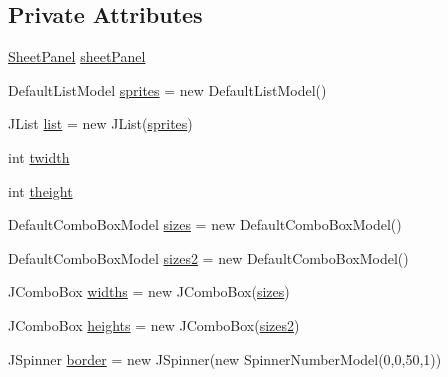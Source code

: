 \subsection*{Private Attributes}
\begin{DoxyCompactItemize}
\item 
\mbox{\hyperlink{classorg_1_1newdawn_1_1slick_1_1tools_1_1packulike_1_1_sheet_panel}{Sheet\+Panel}} \mbox{\hyperlink{classorg_1_1newdawn_1_1slick_1_1tools_1_1packulike_1_1_packer_af39b29a5c9105d3079b3e2df19008ad8}{sheet\+Panel}}
\item 
Default\+List\+Model \mbox{\hyperlink{classorg_1_1newdawn_1_1slick_1_1tools_1_1packulike_1_1_packer_a5684e96219ce89e574c4550d3c650eaa}{sprites}} = new Default\+List\+Model()
\item 
J\+List \mbox{\hyperlink{classorg_1_1newdawn_1_1slick_1_1tools_1_1packulike_1_1_packer_a45e8438e951eb84f2efaf06e5ae481bd}{list}} = new J\+List(\mbox{\hyperlink{classorg_1_1newdawn_1_1slick_1_1tools_1_1packulike_1_1_packer_a5684e96219ce89e574c4550d3c650eaa}{sprites}})
\item 
int \mbox{\hyperlink{classorg_1_1newdawn_1_1slick_1_1tools_1_1packulike_1_1_packer_ad8d50a999815f740d8690c45e408db6c}{twidth}}
\item 
int \mbox{\hyperlink{classorg_1_1newdawn_1_1slick_1_1tools_1_1packulike_1_1_packer_ae627e80430f7f495a1c7542ea9040668}{theight}}
\item 
Default\+Combo\+Box\+Model \mbox{\hyperlink{classorg_1_1newdawn_1_1slick_1_1tools_1_1packulike_1_1_packer_a29634c52b37f367f3e1c6f534b690f2d}{sizes}} = new Default\+Combo\+Box\+Model()
\item 
Default\+Combo\+Box\+Model \mbox{\hyperlink{classorg_1_1newdawn_1_1slick_1_1tools_1_1packulike_1_1_packer_a88ad350f9bcdf274650f612a9fec4fd4}{sizes2}} = new Default\+Combo\+Box\+Model()
\item 
J\+Combo\+Box \mbox{\hyperlink{classorg_1_1newdawn_1_1slick_1_1tools_1_1packulike_1_1_packer_a3a9b0950dd21c07824a4c81e42707d17}{widths}} = new J\+Combo\+Box(\mbox{\hyperlink{classorg_1_1newdawn_1_1slick_1_1tools_1_1packulike_1_1_packer_a29634c52b37f367f3e1c6f534b690f2d}{sizes}})
\item 
J\+Combo\+Box \mbox{\hyperlink{classorg_1_1newdawn_1_1slick_1_1tools_1_1packulike_1_1_packer_ae1f6f20e835b26e94eb0b5f687381098}{heights}} = new J\+Combo\+Box(\mbox{\hyperlink{classorg_1_1newdawn_1_1slick_1_1tools_1_1packulike_1_1_packer_a88ad350f9bcdf274650f612a9fec4fd4}{sizes2}})
\item 
J\+Spinner \mbox{\hyperlink{classorg_1_1newdawn_1_1slick_1_1tools_1_1packulike_1_1_packer_ad52e9b53a46d3aa9a1b2f66755558055}{border}} = new J\+Spinner(new Spinner\+Number\+Model(0,0,50,1))

\end{DoxyCompactItemize}
